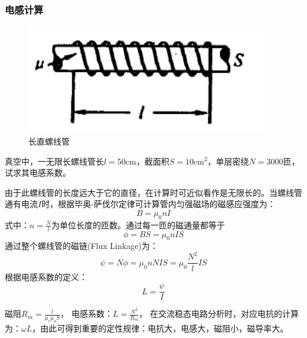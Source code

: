 \documentclass{book}
\begin{document}
\subsubsection{电感计算}
\begin{figure}[H]
	\centering
	\includegraphics[width=25pc]{luoxianguan}
	\caption{长直螺线管}
	\label{fig:luoxianguan}
\end{figure}
真空中，一无限长螺线管长$l=50 \text{cm}$，截面积$S=10 \text{cm}^2$，单层密绕$N=3000$匝，试求其电感系数。
\par 由于此螺线管的长度远大于它的直径，在计算时可近似看作是无限长的。当螺线管通有电流$I$时，根据毕奥-萨伐尔定律可计算管内匀强磁场的磁感应强度为：
\begin{equation}
	B=\mu_{0}nI
\end{equation}
式中：$n=\frac{N}{l}$为单位长度的匝数。通过每一匝的磁通量都等于
\begin{equation}
	\phi=BS=\mu_{0}nIS
\end{equation}
通过整个螺线管的磁链(Flux Linkage)为：
\begin{equation}
	\psi=N\phi=\mu_0 n N I S=\mu_0\frac{N^2}{l}IS
\end{equation}
根据电感系数的定义：
\begin{equation}
	L=\frac{\psi}{I}
\end{equation}

磁阻${{R}_{m}}=\frac{l}{{{\mu }_{r}}{{\mu }_{0}}S}$，
电感系数：$L=\frac{{{N}^{2}}}{{{R}_{m}}}$，
在交流稳态电路分析时，对应电抗的计算为：$\omega L$，由此可得到重要的定性规律：电抗大，电感大，磁阻小，磁导率大。
\end{document}
